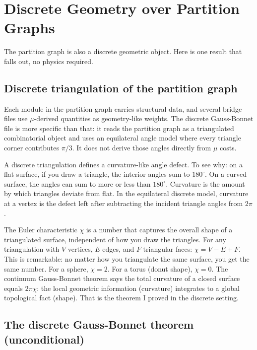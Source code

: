 \documentclass[11pt,a4paper]{article}
\theoremstyle{plain}
\theoremstyle{definition}
\theoremstyle{remark}
\begin{document}
\section{Discrete Geometry over Partition Graphs}
\label{sec:physics}

The partition graph is also a discrete geometric object. Here is one result that falls out, no physics required.

\subsection{Discrete triangulation of the partition graph}

Each module in the partition graph carries structural data, and several bridge files use $\mu$-derived quantities as geometry-like weights. The discrete Gauss-Bonnet file is more specific than that: it reads the partition graph as a triangulated combinatorial object and uses an equilateral angle model where every triangle corner contributes $\pi/3$. It does not derive those angles directly from $\mu$ costs.

A discrete triangulation defines a curvature-like angle defect. To see why: on a flat surface, if you draw a triangle, the interior angles sum to $180^{\circ}$. On a curved surface, the angles can sum to more or less than $180^{\circ}$. Curvature is the amount by which triangles deviate from flat. In the equilateral discrete model, curvature at a vertex is the defect left after subtracting the incident triangle angles from $2\pi$.

The Euler characteristic $\chi$ is a number that captures the overall shape of a triangulated surface, independent of how you draw the triangles. For any triangulation with $V$ vertices, $E$ edges, and $F$ triangular faces: $\chi = V - E + F$. This is remarkable: no matter how you triangulate the same surface, you get the same number. For a sphere, $\chi = 2$. For a torus (donut shape), $\chi = 0$. The continuum Gauss-Bonnet theorem says the total curvature of a closed surface equals $2\pi\chi$: the local geometric information (curvature) integrates to a global topological fact (shape). That is the theorem I proved in the discrete setting.

\subsection{The discrete Gauss-Bonnet theorem (unconditional)}
\end{document}
